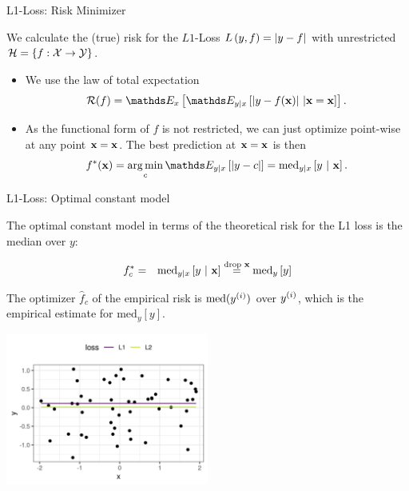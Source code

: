 \documentclass[11pt,compress,t,notes=noshow, xcolor=table]{beamer}
\begin{document}
\begin{vbframe}{L1-Loss: Risk Minimizer}

We calculate the (true) risk for the $L1$-Loss $L\left(y, f\right) = \left|y-f\right|$ with unrestricted $\mathcal{H} = \{f: \mathcal{X} \to \mathcal{Y}\}$. 

\vspace{0.5cm}

\begin{itemize}
  \setlength{\itemsep}{1.4em}  
  \item We use the law of total expectation
  \vspace{0.3cm}
  $$
    \riskf = \E_x \left[\E_{y|x}\left[|y-\fx|~|\xv = \xv\right]\right]. 
  $$
  \item As the functional form of $f$ is not restricted, we can just optimize point-wise at any point $\mathbf{x} = \mathbf{x}$. The best prediction at $\mathbf{x} = \mathbf{x}$ is then 
  \vspace{0.3cm}  
  $$
    f^{\ast}(\xv) = \argmin_c \E_{y|x}\left[|y - c|\right]= \text{med}_{y|x} \left[y ~|~ \xv \right]. 
  $$

\end{itemize}

\end{vbframe}

\begin{vbframe}{L1-Loss: Optimal constant model}

The optimal constant model in terms of the theoretical risk for the L1 loss is the median over $y$:

\begin{eqnarray*}
  f_{c}^{\ast} &=& \text{med}_{y|x} \left[y ~|~ \mathbf{x} \right] \overset{\text{drop } \mathbf{x}}{=}  \text{med}_{y} \left[y \right]
  \end{eqnarray*} 

The optimizer $\hat{f}_c$ of the empirical risk is $\text{med}(y^{(i)})$ over $y^{(i)}$, which is the empirical estimate for $\text{med}_{y} \left[y \right]$. 

\vspace*{-0.3cm}

\begin{center}
\includegraphics[width = 0.5\textwidth ]{figure/l1_vs_l2.png} \\
\end{center}

\end{vbframe}


\endlecture
\end{document}
